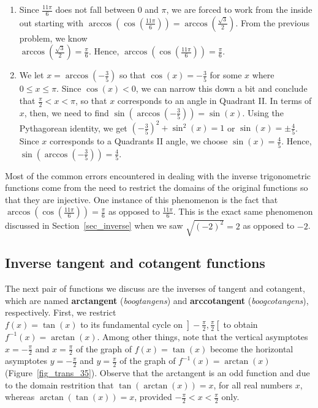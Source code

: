 \begin{example}
\begin{enumerate}
\item Since $\frac{11\pi}{6}$ does not fall between $0$ and $\pi$, we are forced to work from the inside out starting with  $\arccos\left( \cos\left(\frac{11\pi}{6}\right)\right) = \arccos\left(\frac{\sqrt{3}}{2}\right)$.  From the previous problem, we know \\ $\arccos\left(\frac{\sqrt{3}}{2}\right) = \frac{\pi}{6}$.  Hence,  $\arccos\left( \cos\left(\frac{11\pi}{6}\right)\right) = \frac{\pi}{6}$.

\item  We let $x = \arccos\left(-\frac{3}{5}\right)$ so that  $\cos(x) = -\frac{3}{5}$ for some $x$ where  $0 \leq x \leq \pi$.  Since $\cos(x) < 0$, we can narrow this down a bit and conclude that $\frac{\pi}{2} < x < \pi$, so that $x$ corresponds to an angle in Quadrant II. In terms of $x$, then, we need to find $\sin\left(\arccos\left(-\frac{3}{5}\right)\right) = \sin(x)$.  Using the Pythagorean identity, we get $\left(-\frac{3}{5}\right)^2 + \sin^{2}(x) = 1$ or $\sin(x) = \pm \frac{4}{5}$.  Since $x$ corresponds to a Quadrants II angle, we choose  $\sin(x) = \frac{4}{5}$.  Hence,  $\sin\left(\arccos\left(-\frac{3}{5}\right)\right) = \frac{4}{5}$.

\end{enumerate}
\end{example}

 Most of the common errors encountered in dealing with the inverse trigonometric functions come from the need to restrict the domains of the original functions so that they are injective.  One instance of this phenomenon is the fact that $\arccos\left( \cos\left(\frac{11\pi}{6}\right)\right) = \frac{\pi}{6}$ as opposed to $\frac{11\pi}{6}$. This is the exact same phenomenon discussed in Section~\ref{sec_inverse} when we saw  $\sqrt{(-2)^2} = 2$ as opposed to $-2$.   

\subsection{Inverse tangent and cotangent functions}
The next pair of functions we  discuss are the inverses of tangent and cotangent, which are named \textbf{arctangent} (\textit{boogtangens}) and \textbf{arccotangent} (\textit{boogcotangens}), respectively.  First, we restrict \\ $f(x) = \tan(x)$ to its fundamental cycle on $\left.\right]-\frac{\pi}{2}, \frac{\pi}{2}\left[\right.$ to obtain $f^{-1}(x) = \arctan(x)$. Among other things, note that the vertical asymptotes $x = -\frac{\pi}{2}$ and $x = \frac{\pi}{2}$ of the graph of $f(x) = \tan(x)$ become the horizontal asymptotes $y = -\frac{\pi}{2}$ and $y = \frac{\pi}{2}$ of the graph of $f^{-1}(x) = \arctan(x)$ (Figure~\ref{fig_trans_35}).   Observe that the arctangent is an odd function and due to the domain restrition that  $\tan\left(\arctan(x)\right) = x$, for all real numbers $x$, whereas $\arctan(\tan(x)) = x$, provided $-\frac{\pi}{2} < x < \frac{\pi}{2}$ only. 

